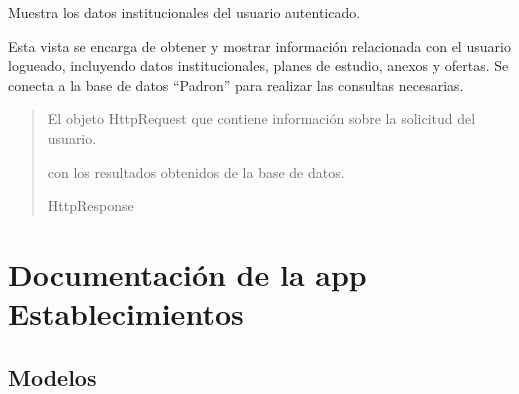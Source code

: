 \documentclass[letterpaper,10pt,spanish]{sphinxmanual}
\begin{document}
\begin{fulllineitems}

\pysigstartsignatures
{}
\pysigstopsignatures
\sphinxAtStartPar
Muestra los datos institucionales del usuario autenticado.

\sphinxAtStartPar
Esta vista se encarga de obtener y mostrar información relacionada
con el usuario logueado, incluyendo datos institucionales, planes de
estudio, anexos y ofertas. Se conecta a la base de datos “Padron” para
realizar las consultas necesarias.
\begin{quote}\begin{description}
\sphinxAtStartPar
{} \textendash{} El objeto HttpRequest que contiene información sobre la
solicitud del usuario.

\sphinxAtStartPar
\begin{description}
\sphinxAtStartPar
con los resultados obtenidos de la base de datos.

\end{description}


\sphinxAtStartPar
HttpResponse

\end{description}\end{quote}

\end{fulllineitems}


\sphinxstepscope


\chapter{Documentación de la app Establecimientos}
\label{\detokenize{establecimientos:documentacion-de-la-app-establecimientos}}\label{\detokenize{establecimientos::doc}}

\section{Modelos}
\label{\detokenize{establecimientos:modelos}}
\end{document}
